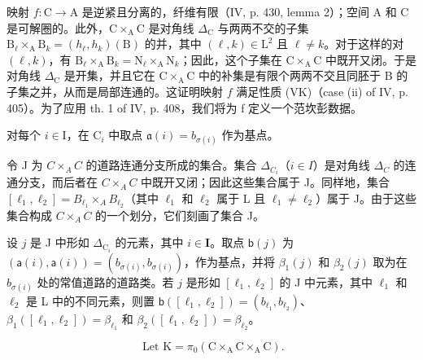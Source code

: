 映射 \(f \colon \mathrm{C} \to \mathrm{A}\) 是逆紧且分离的，纤维有限（IV, p. 430, lemma 2）；空间 A 和 C 是可解圈的。此外，\(\mathrm{C} \times_{\mathrm{A}} \mathrm{C}\) 是对角线 \(\Delta_{\mathrm{C}}\) 与两两不交的子集 \(\mathrm{B}_{\ell} \times_{\mathrm{A}} \mathrm{B}_{k} = (h_{\ell}, h_{k})(\mathrm{B})\) 的并，其中 \((\ell, k) \in \mathrm{L}^2\) 且 \(\ell \neq k\)。对于这样的对 \((\ell, k)\)，有 \(\mathrm{B}_{\ell} \times_{\mathrm{A}} \mathrm{B}_{k} = \mathrm{N}_{\ell} \times_{\mathrm{A}} \mathrm{N}_{k}\)；因此，这个子集在 \(\mathrm{C} \times_{\mathrm{A}} \mathrm{C}\) 中既开又闭。于是对角线 \(\Delta_{\mathrm{C}}\) 是开集，并且它在 \(\mathrm{C} \times_{\mathrm{A}} \mathrm{C}\) 中的补集是有限个两两不交且同胚于 B 的子集之并，从而是局部连通的。这证明映射 \(f\) 满足性质 (VK)（case (ii) of IV, p. 405）。为了应用 th. 1 of IV, p. 408，我们将为 f 定义一个范坎彭数据。

对每个 \(i \in \mathrm{I}\)，在 \(\mathrm{C}_i\) 中取点 \(\mathfrak{a}(i) = b_{\sigma(i)}\) 作为基点。

令 J 为 \(C \times_{A} C\) 的道路连通分支所成的集合。集合 \(\Delta_{C_{i}}\)（\(i \in I\)）是对角线 \(\Delta_{C}\) 的连通分支，而后者在 \(C \times_{A} C\) 中既开又闭；因此这些集合属于 J。同样地，集合 \([\ell_{1}, \ell_{2}] = B_{\ell_{1}} \times_{A} B_{\ell_{2}}\)（其中 \(\ell_{1}\) 和 \(\ell_{2}\) 属于 L 且 \(\ell_{1} \neq \ell_{2}\)）属于 J。由于这些集合构成 \(C \times_{A} C\) 的一个划分，它们刻画了集合 J。

设 \(j\) 是 J 中形如 \(\Delta_{\mathrm{C}_i}\) 的元素，其中 \(i \in \mathbf{I}\)。取点 \(\mathsf{b}(j)\) 为 \((\mathsf{a}(i), \mathsf{a}(i)) = (b_{\sigma(i)}, b_{\sigma(i)})\)，作为基点，并将 \(\beta_1(j)\) 和 \(\beta_2(j)\) 取为在 \(b_{\sigma(i)}\) 处的常值道路的道路类。若 \(j\) 是形如 \([\ell_1, \ell_2]\) 的 J 中元素，其中 \(\ell_1\) 和 \(\ell_2\) 是 L 中的不同元素，则置 \(\mathsf{b}([\ell_1, \ell_2]) = (b_{\ell_1}, b_{\ell_2})\)、\(\beta_1([\ell_1, \ell_2]) = \beta_{\ell_1}\) 和 \(\beta_2([\ell_1, \ell_2]) = \beta_{\ell_2}\)。

\[
\text { Let } \mathrm{K} = \pi_ {0} (\mathrm{C} \times_ {\mathrm{A}} \mathrm{C} \times_ {\mathrm{A}} \mathrm{C}).
\]

